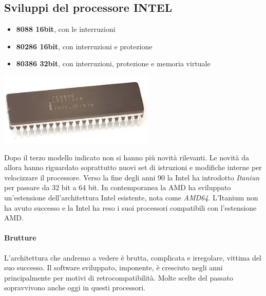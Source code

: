 \documentclass[11pt]{report}
\theoremstyle{definition}
\begin{document}
\subsection{Sviluppi del processore INTEL}
\begin{multicols}{2}
\small
\begin{itemize}
\item \textbf{8088 16bit}, con le interruzioni
\item \textbf{80286 16bit}, con interruzioni e protezione
\item \textbf{80386 32bit}, con interruzioni, protezione e memoria virtuale
\end{itemize}
\normalsize
\columnbreak
\begin{center}
\includegraphics[scale=.75]{img/131.PNG}
\end{center}
\end{multicols}
\noindent Dopo il terzo modello indicato non si hanno più novità rilevanti. Le novità da allora hanno riguardato soprattutto nuovi set di istruzioni e modifiche interne per velocizzare il processore. Verso la fine degli anni 90 la Intel ha introdotto \emph{Itaniun} per passare da 32 bit a 64 bit. In contemporanea la AMD ha sviluppato un'estensione dell'architettura Intel esistente, nota come \emph{AMD64}. L'Itanium non ha avuto successo e la Intel ha reso i suoi processori compatibili con l'estensione AMD.

\paragraph{Brutture} L'architettura che andremo a vedere è brutta, complicata e irregolare, vittima del suo successo. Il software sviluppato, imponente, è cresciuto negli anni principalmente per motivi di retrocompatibilità. Molte scelte del passato sopravvivono anche oggi in questi processori. 
\end{document}
